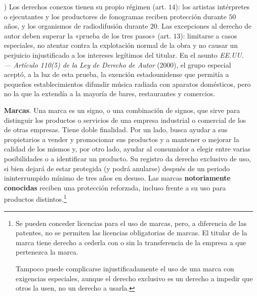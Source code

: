 \documentclass[10pt,a4paper]{article}
\newcounter{alphaitem}
\newenvironment{la}
      {\begin{list}{\alph{alphaitem})}{%
          \usecounter{alphaitem}%
          \setlength{\leftmargin}{1cm}%
          \setlength{\parskip}{3pt}%
          \setlength{\itemsep}{0pt}%
          \setlength{\parsep}{0pt}%
      }}
      {\end{list}}
\begin{document}
\begin{la}
{        Los derechos conexos tienen su propio régimen (art. $14$): los artistas intérpretes o ejecutantes y los productores de fonogramas reciben protección durante $50$ años, y los organismos de radiodifusión durante $20$. Las excepciones al derecho de autor deben superar la «prueba de los tres pasos» (art. $13$): limitarse a casos especiales, no atentar contra la explotación normal de la obra y no causar un perjuicio injustificado a los intereses legítimos del titular. En el asunto \textit{EE.UU. --- Artículo 110(5) de la Ley de Derecho de Autor} (2000), el grupo especial aceptó, a la luz de esta prueba, la exención estadounidense que permitía a pequeños establecimientos difundir música radiada con aparatos domésticos, pero no la que la extendía a la mayoría de bares, restaurantes y comercios.
    }
    \item \textbf{Marcas}. Una marca es un signo, o una combinación de signos, que sirve para distinguir los productos o servicios de una empresa industrial o comercial de los de otras empresas. Tiene doble finalidad. Por un lado, busca ayudar a sus propietarios a vender y promocionar sus productos y a mantener o mejorar la calidad de los mismos y, por otro lado, ayudar al consumidor a elegir entre varias posibilidades o a identificar un producto. Su registro da derecho exclusivo de uso, si bien dejará de estar protegida (y podrá anularse) después de un periodo ininterrumpido mínimo de tres años en desuso. Las marcas \textbf{notoriamente conocidas} reciben una protección reforzada, incluso frente a su uso para productos distintos.\footnote{%
        Se pueden conceder licencias para el uso de marcas, pero, a diferencia de las patentes, no se permiten las licencias obligatorias de marcas. El titular de la marca tiene derecho a cederla con o sin la transferencia de la empresa a que pertenezca la marca. 
        
        Tampoco puede complicarse injustificadamente el uso de una marca con exigencias especiales, aunque el derecho exclusivo es un derecho a impedir que otros la usen, no un derecho a usarla.

}
\end{la}
\end{document}
